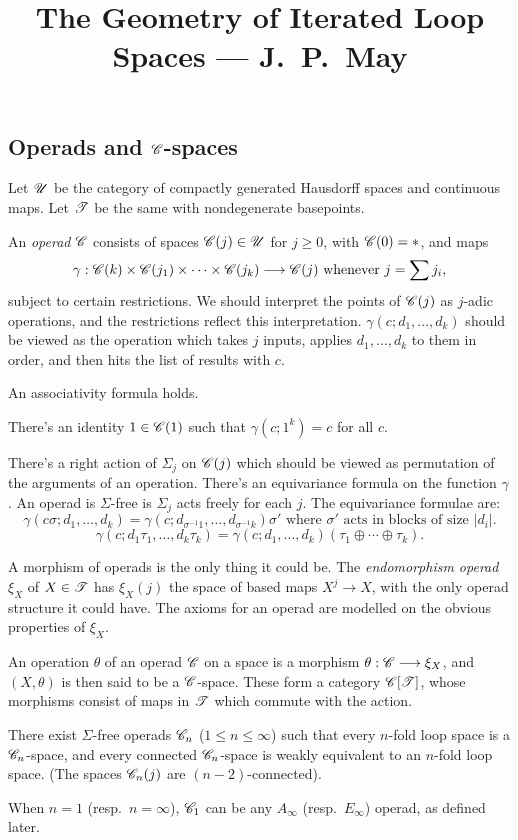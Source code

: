 \documentclass[11pt]{article}
\title{The Geometry of Iterated Loop Spaces\small{ --- J.\ P.\ May}}
\begin{document}
\begin{chapter1-3}
\section{Operads and \texorpdfstring{$\mathscr{C}$}{C}-spaces}
Let $\mathscr{U}$ be the category of compactly generated Hausdorff spaces and continuous
 maps. 
Let $\mathscr{T}$ be the same with nondegenerate basepoints.

An \emph{operad} $\mathscr{C}$ consists of spaces $\mathscr{C}(j)\in\mathscr{U}$ for $j\geq0$,
 with $\mathscr{C}(0)=*$, and maps
\[\gamma:\mathscr{C}(k)\times\mathscr{C}(j_1)\times\cdots\times\mathscr{C}(j_k)\longrightarrow\mathscr{C}(j)
\text{ whenever }j=\sum j_i,\]
subject to certain restrictions. We should interpret the points of $\mathscr{C}(j)$ as
$j$-adic operations, and the restrictions reflect this interpretation.
$\gamma(c;d_1,\ldots,d_k)$ should be viewed as the operation which takes $j$
inputs, applies $d_1,\ldots,d_k$ to them in order, and then hits the list of
results with $c$.
\begin{itemise}
\item An associativity formula holds.
\item There's an identity $1\in\mathscr{C}(1)$ such that $\gamma(c;1^k)=c$ for all $c$.
\item There's a right action of $\Sigma_j$ on $\mathscr{C}(j)$ which should be viewed as
permutation of the arguments of an operation. There's an equivariance formula on
the function $\gamma$. An operad is $\Sigma$-free is $\Sigma_j$ acts freely for
each $j$. The equivariance formulae are:
\[\gamma(c\sigma;d_1,\ldots,d_k)=\gamma(c;d_{\sigma^{-1}1},\ldots,
d_{\sigma^{-1}k})\sigma'\text{ where }\sigma'\text{ acts in 
blocks of size $|d_i|$}.\]
\[\gamma(c;d_1\tau_1,\ldots,d_k\tau_k)=\gamma(c;d_1,\ldots,d_k)(\tau_1\oplus
\cdots\oplus\tau_k).\]
\end{itemise}
A morphism of operads is the only thing it could be. The \emph{endomorphism
operad} $\xi_X$ of $X\in\mathscr{T}$ has $\xi_X(j)$ the space of based maps $X^j\to
X$, with the only operad structure it could have. The axioms for an operad are
modelled on the obvious properties of $\xi_X$.

An operation $\theta$ of an operad $\mathscr{C}$ on a space is a morphism
$\theta:\mathscr{C}\longrightarrow\xi_X$, and $(X,\theta)$ is then said to be a $\mathscr{C}$-space. These
form a category $\mathscr{C}[\mathscr{T}]$, whose morphisms consist of maps in $\mathscr{T}$ which
commute with the action.
\begin{thm*}[1.3]
There exist $\Sigma$-free operads $\mathscr{C}_n$ ($1\leq n\leq\infty$) such that every
$n$-fold loop space is a $\mathscr{C}_n$-space, and every connected $\mathscr{C}_n$-space
is weakly equivalent to an $n$-fold loop space. (The spaces $\mathscr{C}_n(j)$ are 
$(n-2)$-connected).
\end{thm*}
When $n=1$  (resp.\ $n=\infty$), $\mathscr{C}_1$ can be any $A_\infty$ 
(resp.\ $E_\infty$) operad, as defined later.


\end{chapter1-3}
\end{document}
